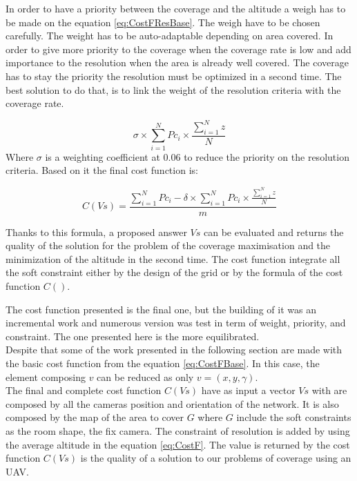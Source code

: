 In order to have a priority  between the coverage and the altitude a weigh has to be made on the equation \ref{eq:CostFResBase}. The weigh have to be chosen carefully.
The weight has to be auto-adaptable depending on area covered. In order to give more priority to the coverage when the coverage rate is low and add importance to the resolution when the area is already well covered. The coverage has to stay the priority the resolution must be optimized in a second time.
The best solution to do that, is to link the weight of the resolution criteria with the coverage rate.

\begin{equation}\label{eq:CostFResPondere}
  \sigma \times \sum_{i=1}^N {Pc_i} \times \frac{\sum_{i=1}^N z}{N}     
\end{equation}
Where $\sigma$ is a weighting coefficient at 0.06 to reduce the priority on the resolution criteria. 
Based on it the final cost function is: 

\begin{equation}\label{eq:CostF}
C(Vs) =  \frac{\sum_{i=1}^N{Pc_i}  - \delta  \times \sum_{i=1}^N {Pc_i} \times \frac{\sum_{i=1}^N z}{N}  }{m}   
\end{equation}

Thanks to this formula, a proposed answer $Vs$ can be evaluated and returns the quality of the solution for the problem of the coverage maximisation and the minimization of the altitude in the second time. The cost function integrate all the soft constraint either by the design of the grid or by the formula of the cost function $C()$.

The cost function presented is the final one, but the building of it was an incremental work and numerous version was test in term of weight, priority, and constraint. The one presented here is the more equilibrated.\\ 
Despite that some of the work  presented in the following section are made with the basic cost function from the equation \ref{eq:CostFBase}. In this case, the element composing $v$ can be reduced as only $v=(x,y,\gamma)$.\\

The final and complete cost function $C(Vs)$ have as input a vector $Vs$ with are composed by all the cameras position and orientation of the network. It is also composed by the map of the area to cover $G$ where $G$ include the soft constraints as the room shape, the fix camera. The constraint of resolution is added by using the average altitude in the equation \ref{eq:CostF}.
The value is returned by the cost function $C(Vs)$ is the quality of a solution to our problems of coverage using an UAV.






